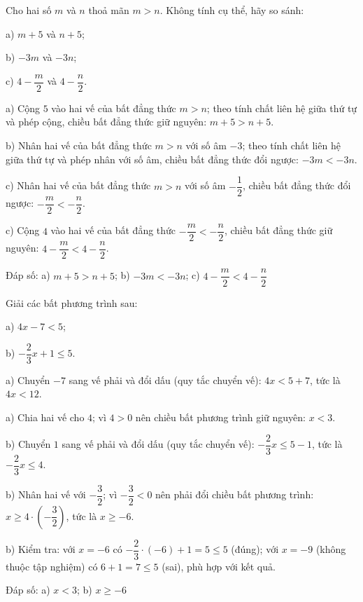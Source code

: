 \begin{problem}[9DS-BPT-033]
Cho hai số $m$ và $n$ thoả mãn $m > n$. Không tính cụ thể, hãy so sánh:

a) $m + 5$ và $n + 5$;

b) $-3m$ và $-3n$;

c) $4 - \dfrac{m}{2}$ và $4 - \dfrac{n}{2}$.

\begin{solution}
a) Cộng $5$ vào hai vế của bất đẳng thức $m > n$; theo tính chất liên hệ giữa thứ tự và phép cộng, chiều bất đẳng thức giữ nguyên: $m + 5 > n + 5$.

b) Nhân hai vế của bất đẳng thức $m > n$ với số âm $-3$; theo tính chất liên hệ giữa thứ tự và phép nhân với số âm, chiều bất đẳng thức đổi ngược: $-3m < -3n$.

c) Nhân hai vế của bất đẳng thức $m > n$ với số âm $-\dfrac{1}{2}$, chiều bất đẳng thức đổi ngược: $-\dfrac{m}{2} < -\dfrac{n}{2}$.

c) Cộng $4$ vào hai vế của bất đẳng thức $-\dfrac{m}{2} < -\dfrac{n}{2}$, chiều bất đẳng thức giữ nguyên: $4 - \dfrac{m}{2} < 4 - \dfrac{n}{2}$.

Đáp số: a) $\boxed{m + 5 > n + 5}$; b) $\boxed{-3m < -3n}$; c) $\boxed{4 - \dfrac{m}{2} < 4 - \dfrac{n}{2}}$
\end{solution}
\end{problem}

\begin{problem}[9DS-BPT-034]
Giải các bất phương trình sau:

a) $4x - 7 < 5$;

b) $-\dfrac{2}{3}x + 1 \leq 5$.

\begin{solution}
a) Chuyển $-7$ sang vế phải và đổi dấu (quy tắc chuyển vế): $4x < 5 + 7$, tức là $4x < 12$.

a) Chia hai vế cho $4$; vì $4 > 0$ nên chiều bất phương trình giữ nguyên: $x < 3$.

b) Chuyển $1$ sang vế phải và đổi dấu (quy tắc chuyển vế): $-\dfrac{2}{3}x \leq 5 - 1$, tức là $-\dfrac{2}{3}x \leq 4$.

b) Nhân hai vế với $-\dfrac{3}{2}$; vì $-\dfrac{3}{2} < 0$ nên phải đổi chiều bất phương trình: $x \geq 4 \cdot \left(-\dfrac{3}{2}\right)$, tức là $x \geq -6$.

b) Kiểm tra: với $x = -6$ có $-\dfrac{2}{3} \cdot (-6) + 1 = 5 \leq 5$ (đúng); với $x = -9$ (không thuộc tập nghiệm) có $6 + 1 = 7 \leq 5$ (sai), phù hợp với kết quả.

Đáp số: a) $\boxed{x < 3}$; b) $\boxed{x \geq -6}$
\end{solution}
\end{problem}


